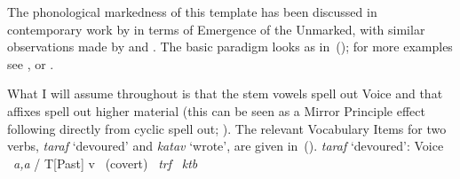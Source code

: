 {The phonological markedness of this template has been discussed in contemporary work by \cite{ussishkin05} in terms of Emergence of the Unmarked, with similar observations made by \cite{laks11} and \cite{borer13oup,borer15roots}. The basic paradigm looks as in~(\nextx); for more examples see \cite{schwarzwald08}, \cite{faust12} or \cite{kastner18nllt}.

\ex
{}
\xe

What I will assume throughout is that the stem vowels spell out Voice and that affixes spell out higher material (this can be seen as a Mirror Principle effect following directly from cyclic spell out; \citealt{baker85,muysken88,zukoff16nels,kastner18nllt}). The relevant Vocabulary Items for two verbs, \emph{taraf} `devoured' and \emph{katav} `wrote', are given in~(\nextx).
\pex \emph{taraf} `devoured':
	\a Voice \lra~\emph{a,a} / T[Past] \trace
	\a v \lra~(covert)
	\a {} \lra~\emph{trf}
	\a {} \lra~\emph{ktb}
\xe

}
